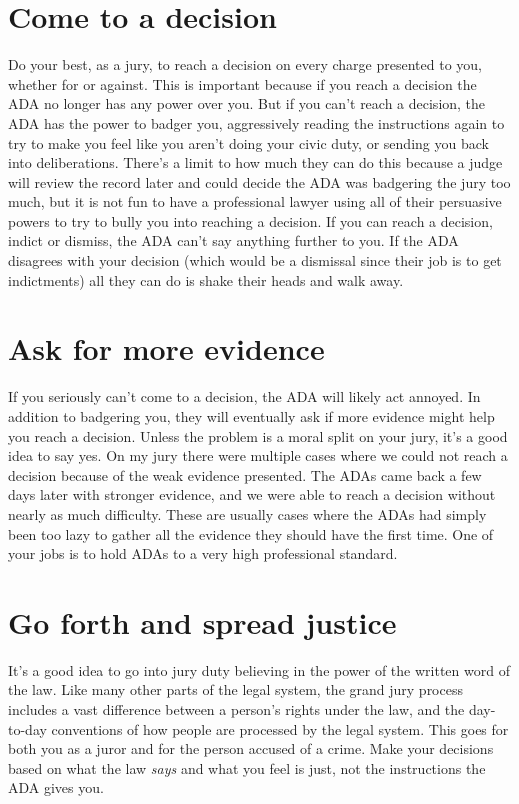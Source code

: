 \documentclass[letterpaper]{article}
\begin{document}
\section*{Come to a decision}
Do your best, as a jury, to reach a decision on every charge presented to you, whether for or against.
This is important because if you reach a decision the ADA no longer has any power over you.
But if you can't reach a decision, the ADA has the power to badger you, aggressively reading the instructions again to try to make you feel like you aren't doing your civic duty, or sending you back into deliberations. 
There's a limit to how much they can do this because a judge will review the record later and could decide the ADA was badgering the jury too much, but it is not fun to have a professional lawyer using all of their persuasive powers to try to bully you into reaching a decision. 
If you can reach a decision, indict or dismiss, the ADA can't say anything further to you. 
If the ADA disagrees with your decision (which would be a dismissal since their job is to get indictments) all they can do is shake their heads and walk away.

\section*{Ask for more evidence}
If you seriously can't come to a decision, the ADA will likely act annoyed.
In addition to badgering you, they will eventually ask if more evidence might help you reach a decision.
Unless the problem is a moral split on your jury, it's a good idea to say yes.
On my jury there were multiple cases where we could not reach a decision because of the weak evidence presented.
The ADAs came back a few days later with stronger evidence, and we were able to reach a decision without nearly as much difficulty.
These are usually cases where the ADAs had simply been too lazy to gather all the evidence they should have the first time.
One of your jobs is to hold ADAs to a very high professional standard.

\section*{Go forth and spread justice}
It's a good idea to go into jury duty believing in the power of the written word of the law. 
Like many other parts of the legal system, the grand jury process includes a vast difference between a person's rights under the law, and the day-to-day conventions of how people are processed by the legal system.
This goes for both you as a juror and for the person accused of a crime.
Make your decisions based on what the law \emph{says} and what you feel is just, not the instructions the ADA gives you. 
\end{document}
